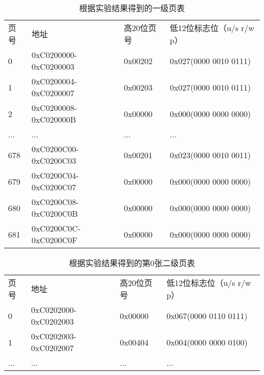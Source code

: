 \begin{table}[htbp]
\centering
 \begin{tabular}{llll}\toprule
    页号 & 地址    & 高20位页号  & 低12位标志位（u/s r/w p）\\
    0&0xC0200000-0xC0200003&0x00202&0x027(0000 0010 0111)\\
    1&0xC0200004-0xC0200007&0x00203&0x027(0000 0010 0111)\\
    2&0xC0200008-0xC020000B&0x00000&0x000(0000 0000 0000)\\
 ...      &...&...&...        \\
    678&0xC0200C00-0xC0200C03&0x00201&0x023(0000 0010 0011)\\
    679&0xC0200C04-0xC0200C07&0x00000&0x000(0000 0000 0000)\\
    680&0xC0200C08-0xC0200C0B&0x00000&0x000(0000 0000 0000)\\
    681&0xC0200C0C-0xC0200C0F&0x00000&0x000(0000 0000 0000)\\
   \bottomrule
\end{tabular}
\caption{根据实验结果得到的一级页表}\label{directory_after}
\end{table}

\begin{table}[htbp]
\centering
 \begin{tabular}{llll}\toprule
    页号 & 地址    & 高20位页号  & 低12位标志位（u/s r/w p）\\
    0&0xC0202000-0xC0202003&0x00000&0x067(0000 0110 0111)\\
    1&0xC0202003-0xC0202007&0x00404&0x004(0000 0000 0100)\\
 ...      &...&...&...        \\
   \bottomrule
\end{tabular}
\caption{根据实验结果得到的第0张二级页表}\label{page0_after}
\end{table}


